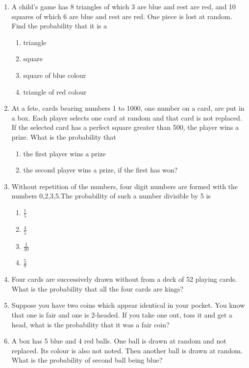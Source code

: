 \begin{enumerate}
\item A child's game has 8 triangles of which 3 are blue and rest are red, and 10 squares of which 6 are blue and rest are red. One piece is lost at random. Find the probability that it is a
\begin{enumerate}
\item triangle 
\item square 
\item square of blue colour 
\item triangle of red colour           
\end{enumerate}
\solution

\item At a fete, cards bearing numbers 1 to 1000, one number on a card, are put in a box. Each player selects one card at random and that card is not replaced. If the selected card has a perfect square greater than 500, the player wins a prize. What is the probability that 
\begin{enumerate}
\item the first player wins a prize
\item the second player wins a prize, if the first has won?
\end{enumerate}
\solution

\item Without repetition of the numbers, four digit numbers are formed with the numbers 0,2,3,5.The
probability of such a number divisible by 5 is
\begin{enumerate}
\item $\frac{1}{5}$ 
\item $\frac{4}{5}$
\item $\frac{1}{30}$ 
\item $\frac{5}{9}$
\end{enumerate}
\solution

\item Four cards are successively drawn without from a deck of 52 playing cards. What is the probability that all the four cards are kings?
\\

\item Suppose you have two coins which appear identical in your pocket. You know
that one is fair and one is 2-headed. If you take one out, toss it and get a head,
what is the probability that it was a fair coin?
\\

\item A box has 5 blue and 4 red balls. One ball is drawn at random and not replaced. Its colour is also not noted. Then another ball is drawn at random. What is the probability of second ball being blue?

\end{enumerate}
